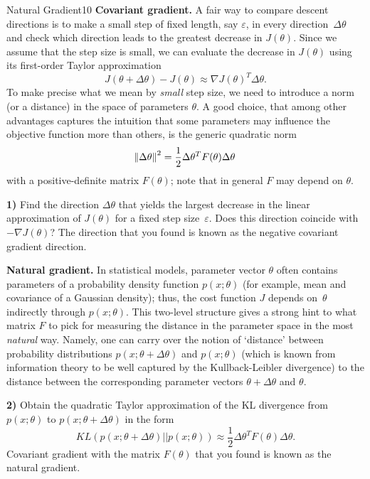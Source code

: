 \begin{questions}
\begin{question}[bonus]{Natural Gradient}{10}
\textbf{Covariant gradient.}
A fair way to compare descent directions is to make
a small step of fixed length, say $\varepsilon$,
in every direction~$\Delta \theta$ and check
which direction leads to the greatest decrease in $J(\theta)$.
Since we assume that the step size is small, we can evaluate
the decrease in $J(\theta)$ using its first-order Taylor approximation
\begin{equation*}
  J(\theta + \Delta \theta) - J(\theta) \approx
  \nabla J(\theta)^T \Delta \theta.
\end{equation*}
To make precise what we mean by \textit{small} step size,
we need to introduce a norm (or a distance)
in the space of parameters $\theta$.
A good choice, that among other advantages captures the intuition
that some parameters may influence the objective function more
than others,
is the generic quadratic norm
\begin{equation*}
  \norm{\Delta \theta}^2 =
  \frac{1}{2}\Delta \theta^T F(\theta) \Delta \theta
\end{equation*}
with a positive-definite matrix $F(\theta)$;
note that in general $F$ may depend on $\theta$.

\textbf{1)} Find the direction $\Delta \theta$ that yields
the largest decrease in the linear approximation of $J(\theta)$
for a fixed step size~$\varepsilon$.
Does this direction coincide with $-\nabla J(\theta)$?
The direction that you found is known as the
negative covariant gradient direction.

\textbf{Natural gradient.}
In statistical models, parameter vector $\theta$ often
contains parameters of a probability density function $p(x; \theta)$
(for example, mean and covariance of a Gaussian density);
thus, the cost function $J$ depends on~$\theta$ indirectly
through $p(x; \theta)$.
This two-level structure gives a strong hint to what matrix $F$
to pick for measuring the distance in the parameter space
in the most \textit{natural} way.
Namely, one can carry over the notion of `distance' between
probability distributions $p(x; \theta + \Delta \theta)$
and $p(x; \theta)$ (which is known from information theory
to be well captured by the Kullback-Leibler divergence)
to the distance between the corresponding parameter vectors
$\theta + \Delta \theta$ and $\theta$.

\textbf{2)} Obtain the quadratic Taylor approximation
of the KL divergence
from $p(x; \theta)$ to $p(x; \theta + \Delta \theta)$ in the form
\begin{equation*}
  KL(p(x; \theta + \Delta \theta) || p(x; \theta)) \approx
  \frac{1}{2}\Delta \theta^T F(\theta) \Delta \theta.
\end{equation*}
Covariant gradient with the matrix $F(\theta)$ that you found
is known as the natural gradient.

\begin{answer}\end{answer}

\end{question}




\end{questions}
